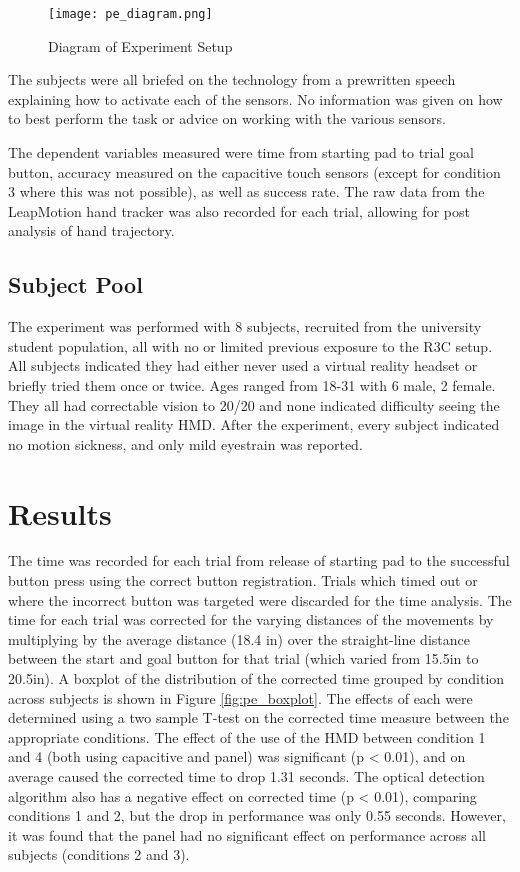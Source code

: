\begin{figure}
    \centering
    \texttt{[image: pe\_diagram.png]}
    \caption{Diagram of Experiment Setup}
    \label{fig:pe_diagram}
\end{figure}

The subjects were all briefed on the technology from a prewritten speech explaining how to activate each of the sensors.
No information was given on how to best perform the task or advice on working with the various sensors.

The dependent variables measured were time from starting pad to trial goal button, accuracy measured on the capacitive touch sensors (except for condition 3 where this was not possible), as well as success rate.
The raw data from the LeapMotion hand tracker was also recorded for each trial, allowing for post analysis of hand trajectory.

\subsection{Subject Pool}
The experiment was performed with 8 subjects, recruited from the university student population, all with no or limited previous exposure to the R3C setup.
All subjects indicated they had either never used a virtual reality headset or briefly tried them once or twice.
Ages ranged from 18-31 with 6 male, 2 female.
They all had correctable vision to 20/20 and none indicated difficulty seeing the image in the virtual reality HMD.
After the experiment, every subject indicated no motion sickness, and only mild eyestrain was reported.

\section{Results}

The time was recorded for each trial from release of starting pad to the successful button press using the correct button registration.
Trials which timed out or where the incorrect button was targeted were discarded for the time analysis.
The time for each trial was corrected for the varying distances of the movements by multiplying by the average distance (18.4 in) over the straight-line distance between the start and goal button for that trial (which varied from 15.5in to 20.5in).
A boxplot of the distribution of the corrected time grouped by condition across subjects is shown in Figure \ref{fig:pe_boxplot}.
The effects of each were determined using a two sample T-test on the corrected time measure between the appropriate conditions.
The effect of the use of the HMD between condition 1 and 4 (both using capacitive and panel) was significant (p < 0.01), and on average caused the corrected time to drop 1.31 seconds.
The optical detection algorithm also has a negative effect on corrected time (p < 0.01), comparing conditions 1 and 2, but the drop in performance was only 0.55 seconds.
However, it was found that the panel had no significant effect on performance across all subjects (conditions 2 and 3).

